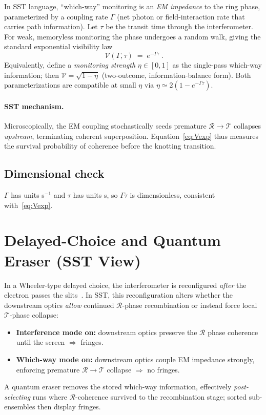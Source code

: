 \documentclass[11pt,a4paper]{article}
\begin{document}
In SST language, ``which-way'' monitoring is an \emph{EM impedance} to the ring phase, parameterized by a coupling rate $\Gamma$ (net photon or field-interaction rate that carries path information).
Let $\tau$ be the transit time through the interferometer.
For weak, memoryless monitoring the phase undergoes a random walk, giving the standard exponential visibility law~\cite{Zurek2003}
\begin{equation}
\boxed{\ \mathcal V(\Gamma,\tau) \;=\; e^{-\Gamma \tau}\ }. \label{eq:Vexp}
\end{equation}
Equivalently, define a \emph{monitoring strength} $\eta\in[0,1]$ as the single-pass which-way information; then $\mathcal V=\sqrt{1-\eta}$ (two-outcome, information-balance form). Both parameterizations are compatible at small $\eta$ via $\eta\simeq 2(1-e^{-\Gamma\tau})$.

\paragraph{SST mechanism.}
    Microscopically, the EM coupling stochastically seeds premature $\mathcal R\!\to\!\mathcal T$ collapses \emph{upstream}, terminating coherent superposition.
    Equation~\eqref{eq:Vexp} thus measures the survival probability of coherence before the knotting transition.

\subsection{Dimensional check}
$\Gamma$ has units s$^{-1}$ and $\tau$ has units s, so $\Gamma\tau$ is dimensionless, consistent with~\eqref{eq:Vexp}.

\section{Delayed-Choice and Quantum Eraser (SST View)}

In a Wheeler-type delayed choice, the interferometer is reconfigured \emph{after} the electron passes the slits~\cite{Wheeler1978}.
In SST, this reconfiguration alters whether the downstream optics \emph{allow} continued $\mathcal R$-phase recombination or instead force local $\mathcal T$-phase collapse:
\begin{itemize}
\item \textbf{Interference mode on:} downstream optics preserve the $\mathcal R$ phase coherence until the screen $\Rightarrow$ fringes.
\item \textbf{Which-way mode on:} downstream optics couple EM impedance strongly, enforcing premature $\mathcal R\!\to\!\mathcal T$ collapse $\Rightarrow$ no fringes.
\end{itemize}
A quantum eraser removes the stored which-way information, effectively \emph{post-selecting} runs where $\mathcal R$-coherence survived to the recombination stage; sorted sub-ensembles then display fringes.
\end{document}
